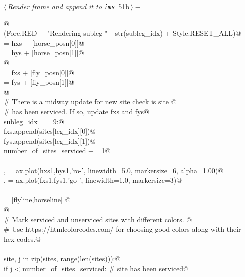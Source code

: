 \documentclass[11.5pt]{report}
\begin{document}
\begin{flushleft} \small\label{scrap75}\raggedright\small
{} $\langle\,${\itshape Render frame and append it to \verb|ims|}\nobreak\ {\footnotesize {51b}}$\,\rangle\equiv$
\vspace{-1ex}
\begin{list}{}{} \item
\mbox{}\verb@   @\\
\mbox{}\verb@debug(Fore.RED + "Rendering subleg "+ str(subleg_idx) + Style.RESET_ALL)@\\
\mbox{} = hxs + [horse_posn[0]]@\\
\mbox{} = hys + [horse_posn[1]]@\\
\mbox{}\verb@               @\\
\mbox{} = fxs + [fly_posn[0]]@\\
\mbox{} = fys + [fly_posn[1]]@\\
\mbox{}\verb@                 @\\
\mbox{}\verb@# There is a midway update for new site check is site @\\
\mbox{}\verb@# has been serviced. If so, update fxs and fys@\\
\mbox{}\verb@if subleg_idx == 9:@\\
\mbox{}\verb@    fxs.append(sites[leg_idx][0])@\\
\mbox{}\verb@    fys.append(sites[leg_idx][1])@\\
\mbox{}\verb@    number_of_sites_serviced += 1@\\
\mbox{}\verb@@\\
\mbox{}\verb@horseline, = ax.plot(hxs1,hys1,'ro-', linewidth=5.0, markersize=6, alpha=1.00)@\\
\mbox{}\verb@flyline,   = ax.plot(fxs1,fys1,'go-', linewidth=1.0, markersize=3)@\\
\mbox{}\verb@@\\
\mbox{}\verb@objs = [flyline,horseline] @\\
\mbox{}\verb@ @\\
\mbox{}\verb@# Mark serviced and unserviced sites with different colors. @\\
\mbox{}\verb@# Use https://htmlcolorcodes.com/ for choosing good colors along with their hex-codes.@\\
\mbox{}\verb@@\\
\mbox{}\verb@for site, j in zip(sites, range(len(sites))):@\\
\mbox{}\verb@    if j < number_of_sites_serviced:       # site has been serviced@\\

\end{list}
\end{flushleft}
\end{document}
